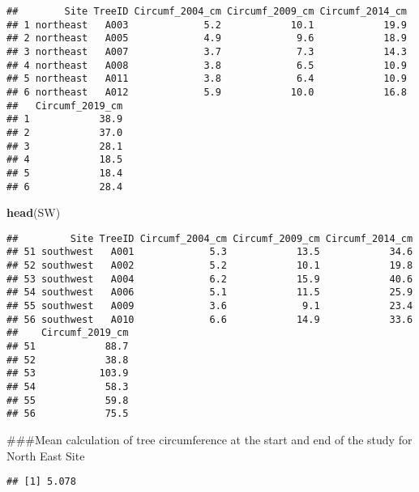 \documentclass[]{article}
\newenvironment{Shaded}{\begin{snugshade}}{\end{snugshade}}
\newcommand{\DecValTok}[1]{\textcolor[rgb]{0.00,0.00,0.81}{#1}}
\newcommand{\KeywordTok}[1]{\textcolor[rgb]{0.13,0.29,0.53}{\textbf{#1}}}
\newcommand{\NormalTok}[1]{#1}
\newcommand{\OperatorTok}[1]{\textcolor[rgb]{0.81,0.36,0.00}{\textbf{#1}}}
\begin{document}
\begin{verbatim}
##        Site TreeID Circumf_2004_cm Circumf_2009_cm Circumf_2014_cm
## 1 northeast   A003             5.2            10.1            19.9
## 2 northeast   A005             4.9             9.6            18.9
## 3 northeast   A007             3.7             7.3            14.3
## 4 northeast   A008             3.8             6.5            10.9
## 5 northeast   A011             3.8             6.4            10.9
## 6 northeast   A012             5.9            10.0            16.8
##   Circumf_2019_cm
## 1            38.9
## 2            37.0
## 3            28.1
## 4            18.5
## 5            18.4
## 6            28.4
\end{verbatim}

\begin{Shaded}
\begin{Highlighting}[]
\KeywordTok{head}\NormalTok{(SW)}
\end{Highlighting}
\end{Shaded}

\begin{verbatim}
##         Site TreeID Circumf_2004_cm Circumf_2009_cm Circumf_2014_cm
## 51 southwest   A001             5.3            13.5            34.6
## 52 southwest   A002             5.2            10.1            19.8
## 53 southwest   A004             6.2            15.9            40.6
## 54 southwest   A006             5.1            11.5            25.9
## 55 southwest   A009             3.6             9.1            23.4
## 56 southwest   A010             6.6            14.9            33.6
##    Circumf_2019_cm
## 51            88.7
## 52            38.8
## 53           103.9
## 54            58.3
## 55            59.8
## 56            75.5
\end{verbatim}

\#\#\#Mean calculation of tree circumference at the start and end of the
study for North East Site

\begin{Shaded}
\end{Shaded}

\begin{verbatim}
## [1] 5.078
\end{verbatim}

\begin{Shaded}
\end{Shaded}
\end{document}
